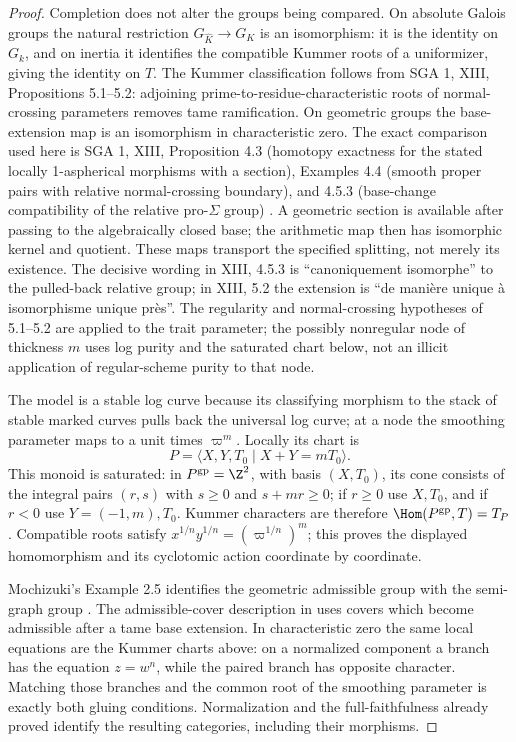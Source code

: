 \begin{proof}
Completion does not alter the groups being compared. On absolute Galois
groups the natural restriction $G_{\widehat K}\to G_K$ is an isomorphism:
it is the identity on $G_k$, and on inertia it identifies the compatible
Kummer roots of a uniformizer, giving the identity on $T$. The Kummer
classification follows from SGA 1, XIII, Propositions 5.1--5.2: adjoining
prime-to-residue-characteristic roots of normal-crossing parameters removes
tame ramification. On geometric groups the base-extension map is an
isomorphism in characteristic zero. The exact comparison used here is
SGA 1, XIII, Proposition 4.3 (homotopy exactness for the stated locally
1-aspherical morphisms with a section), Examples 4.4 (smooth proper pairs
with relative normal-crossing boundary), and 4.5.3 (base-change compatibility
of the relative pro-$\Sigma$ group) \citep{BC_SGA1}. A geometric section is
available after passing to the algebraically closed base; the arithmetic
map then has isomorphic kernel and quotient. These maps transport the
specified splitting, not merely its existence.
The decisive wording in XIII, 4.5.3 is ``canoniquement isomorphe'' to the
pulled-back relative group; in XIII, 5.2 the extension is ``de mani\`ere
unique \`a isomorphisme unique pr\`es''. The regularity and normal-crossing
hypotheses of 5.1--5.2 are applied to the trait parameter; the possibly
nonregular node of thickness $m$ uses log purity and the saturated chart
below, not an illicit application of regular-scheme purity to that node.

The model is a stable log curve because its classifying morphism to the
stack of stable marked curves pulls back the universal log curve; at a node
the smoothing parameter maps to a unit times $\varpi^m$. Locally its chart is
\[
 P=\langle X,Y,T_0\mid X+Y=mT_0\rangle.
\]
This monoid is saturated: in $P^{\rm gp}=\Z^2$, with basis $(X,T_0)$, its
cone consists of the integral pairs $(r,s)$ with $s\ge0$ and $s+mr\ge0$;
if $r\ge0$ use $X,T_0$, and if $r<0$ use $Y=(-1,m),T_0$.
Kummer characters are therefore $\Hom(P^{\rm gp},T)=T_P$.
Compatible roots satisfy $x^{1/n}y^{1/n}=(\varpi^{1/n})^m$; this proves the
displayed homomorphism and its cyclotomic action coordinate by coordinate.

Mochizuki's Example 2.5 identifies the geometric admissible group with the
semi-graph group \citep[Example 2.5]{BC_MochComb}. The admissible-cover
description in \citet[\S2, Definition 2.1]{BC_Moch1996} uses covers which
become admissible after a tame base extension. In characteristic zero the
same local equations are the Kummer charts above: on a normalized component
a branch has the equation $z=w^n$, while the paired branch has opposite
character. Matching those branches and the common root of the smoothing
parameter is exactly both gluing conditions. Normalization and the
full-faithfulness already proved identify the resulting categories, including
their morphisms.


\end{proof}
